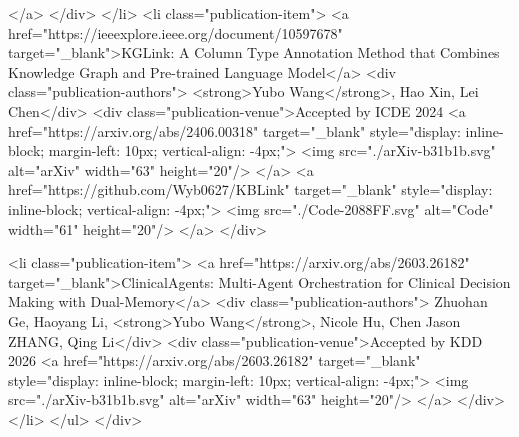                 </a>
            </div>
        </li>
        <li class="publication-item">
            <a href="https://ieeexplore.ieee.org/document/10597678" target="_blank">KGLink: A Column Type Annotation Method that Combines Knowledge Graph and Pre-trained Language Model</a>
            <div class="publication-authors"> <strong>Yubo Wang</strong>, Hao Xin, Lei Chen</div>
            <div class="publication-venue">Accepted by ICDE 2024
                <a href="https://arxiv.org/abs/2406.00318" target="_blank" style="display: inline-block; margin-left: 10px; vertical-align: -4px;">
                    <img src="./arXiv-b31b1b.svg" alt="arXiv" width="63" height="20"/>
                </a>
                <a href="https://github.com/Wyb0627/KBLink" target="_blank" style="display: inline-block; vertical-align: -4px;">
                    <img src="./Code-2088FF.svg" alt="Code" width="61" height="20"/>
                </a>
            </div>

        <li class="publication-item">
            <a href="https://arxiv.org/abs/2603.26182" target="_blank">ClinicalAgents: Multi-Agent Orchestration for Clinical Decision Making with Dual-Memory</a>
            <div class="publication-authors"> Zhuohan Ge, Haoyang Li, <strong>Yubo Wang</strong>, Nicole Hu, Chen Jason ZHANG, Qing Li</div>
            <div class="publication-venue">Accepted by KDD 2026
                <a href="https://arxiv.org/abs/2603.26182" target="_blank" style="display: inline-block; margin-left: 10px; vertical-align: -4px;">
                    <img src="./arXiv-b31b1b.svg" alt="arXiv" width="63" height="20"/>
                </a>
           </div>
        </li>
    </ul>
</div>
